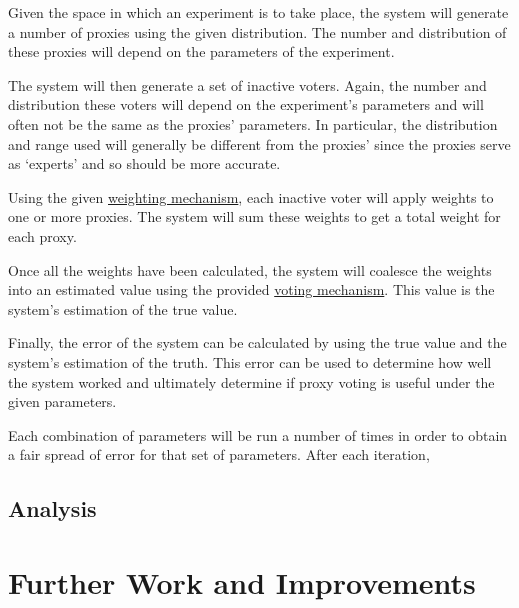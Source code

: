 \begin{enumerate}[label=\textbf{\arabic*}., leftmargin=2\parindent]
    Given the space in which an experiment is to take place, the system will
    generate a number of proxies using the given distribution.
    The number and distribution of these proxies will depend on the
    parameters of the experiment.

    The system will then generate a set of inactive voters.
    Again, the number and distribution these voters will depend on the
    experiment's parameters and will often not be the same as the proxies'
    parameters.
    In particular, the distribution and range used will generally be
    different from the proxies' since the proxies serve as `experts' and so
    should be more accurate.

    Using the given \hyperref[subsec:weight-mechanisms]{weighting mechanism},
    each inactive voter will apply weights to one or more proxies.
    The system will sum these weights to get a total weight for each proxy.

    Once all the weights have been calculated, the system will coalesce
    the weights into an estimated value using the provided
    \hyperref[subsec:voting-mechanisms]{voting mechanism}.
    This value is the system's estimation of the true value.

    Finally, the error of the system can be calculated by using the true
    value and the system's estimation of the truth.
    This error can be used to determine how well the system worked and
    ultimately determine if proxy voting is useful under the given parameters.
\end{enumerate}

Each combination of parameters will be run a number of times in order to obtain
a fair spread of error for that set of parameters.
After each iteration, %



\subsection{Analysis}\label{subsec:analysis}


\section{Further Work and Improvements}\label{sec:further-work-and-improvements}
